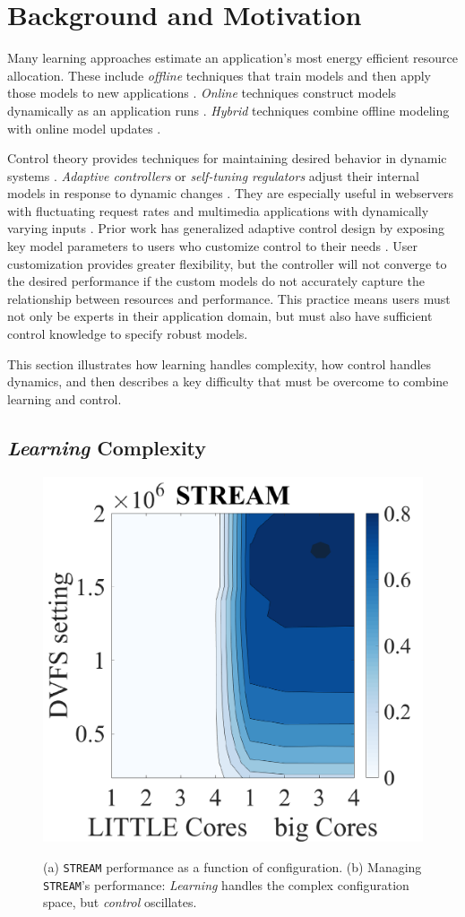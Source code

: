\section{Background and Motivation}
\label{sec:example}
Many learning approaches estimate an application's most energy
efficient resource allocation.  These include \emph{offline}
techniques that train models and then apply those models to new
applications
\cite{Yi2003,LeeBrooks2006,CPR,reddiHPCA2013,PUPiL,quasar}.
\emph{Online} techniques construct models dynamically as an
application runs
\cite{Li2006,Flicker,ParallelismDial,Ponamarev,LeeBrooks}.
\emph{Hybrid} techniques combine offline modeling with online model
updates \cite{packandcap,Winter2010,dubach2010,Koala,Cinder,
  wu2012inferred,LEO}.

Control theory provides techniques for maintaining desired behavior in
dynamic systems \cite{Hellerstein2004a}. \emph{Adaptive controllers}
or \emph{self-tuning regulators} adjust their internal models in
response to dynamic changes \cite{HandbookControl}. They are
especially useful in webservers with fluctuating request rates
\cite{Horvarth,LuEtAl-2006a,SunDaiPan-2008a} and multimedia
applications with dynamically varying inputs
\cite{TCST,Agilos,grace2}.  Prior work has generalized adaptive
control design by exposing key model parameters to users who customize
control to their needs \cite{ControlWare,POET}.  User customization
provides greater flexibility, but the controller will not converge to
the desired performance if the custom models do not accurately capture
the relationship between resources and performance.  This practice
means users must not only be experts in their application domain, but
must also have sufficient control knowledge to specify robust models.

This section illustrates how learning handles complexity, how control
handles dynamics, and then describes a key difficulty that must be
overcome to combine learning and control.

\subsection{\emph{Learning} Complexity}
\begin{figure}
\centering

    \includegraphics[width=.25\textwidth]{figures/STREAM-contour.pdf}
    \label{fig:STREAM_contour}
    
    \label{fig:STREAM_timeline}
  \caption{(a) \texttt{STREAM} performance as a function of
    configuration.  (b) Managing \texttt{STREAM}'s performance:
    \emph{Learning} handles the complex configuration space, but
    \emph{control} oscillates.}
  \label{fig:learning-models1}
\end{figure}

